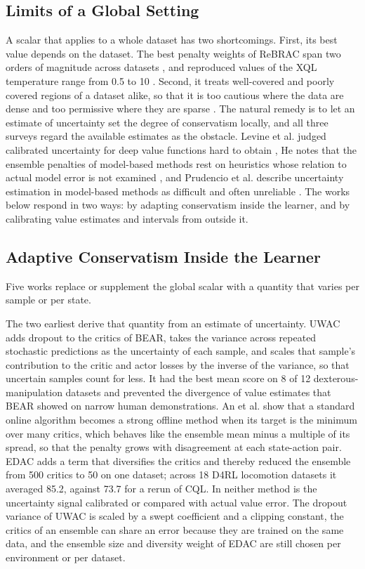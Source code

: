 \documentclass[conference]{IEEEtran}
\begin{document}
\subsection{Limits of a Global Setting}
A scalar that applies to a whole dataset has two shortcomings. First, its best value depends on the dataset. The best penalty weights of ReBRAC span two orders of magnitude across datasets \cite{tarasov2023rebrac}, and reproduced values of the XQL temperature range from 0.5 to 10 \cite{gao2026qql}. Second, it treats well-covered and poorly covered regions of a dataset alike, so that it is too cautious where the data are dense and too permissive where they are sparse \cite{upadhyay2026uniq}. The natural remedy is to let an estimate of uncertainty set the degree of conservatism locally, and all three surveys regard the available estimates as the obstacle. Levine et al. judged calibrated uncertainty for deep value functions hard to obtain \cite{levine2020tutorial}, He notes that the ensemble penalties of model-based methods rest on heuristics whose relation to actual model error is not examined \cite{he2023survey}, and Prudencio et al. describe uncertainty estimation in model-based methods as difficult and often unreliable \cite{prudencio2024survey}. The works below respond in two ways: by adapting conservatism inside the learner, and by calibrating value estimates and intervals from outside it.

\subsection{Adaptive Conservatism Inside the Learner}
Five works replace or supplement the global scalar with a quantity that varies per sample or per state.

The two earliest derive that quantity from an estimate of uncertainty. UWAC \cite{wu2021uwac} adds dropout to the critics of BEAR, takes the variance across repeated stochastic predictions as the uncertainty of each sample, and scales that sample's contribution to the critic and actor losses by the inverse of the variance, so that uncertain samples count for less. It had the best mean score on 8 of 12 dexterous-manipulation datasets and prevented the divergence of value estimates that BEAR showed on narrow human demonstrations. An et al. \cite{an2021edac} show that a standard online algorithm becomes a strong offline method when its target is the minimum over many critics, which behaves like the ensemble mean minus a multiple of its spread, so that the penalty grows with disagreement at each state-action pair. EDAC adds a term that diversifies the critics and thereby reduced the ensemble from 500 critics to 50 on one dataset; across 18 D4RL locomotion datasets it averaged 85.2, against 73.7 for a rerun of CQL. In neither method is the uncertainty signal calibrated or compared with actual value error. The dropout variance of UWAC is scaled by a swept coefficient and a clipping constant, the critics of an ensemble can share an error because they are trained on the same data, and the ensemble size and diversity weight of EDAC are still chosen per environment or per dataset.
\end{document}
